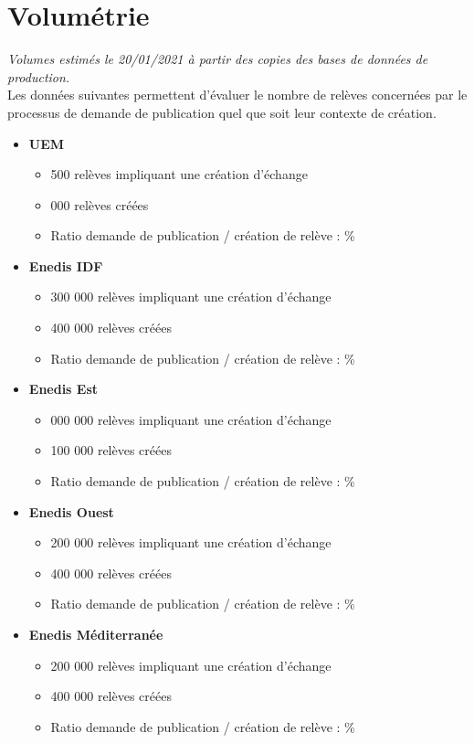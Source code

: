 \documentclass[a4paper, 12pt]{report}
\begin{document}

\chapter{Volumétrie}
\label{appendix:volumetrie}

\textit{Volumes estimés le 20/01/2021 à partir des copies des bases de données de production.}\\

Les données suivantes permettent d’évaluer le nombre de relèves concernées par le processus de demande de publication quel que soit leur contexte de création.\\

\begin{itemize}
  \item \textbf{UEM}
  \begin{itemize}
    \item \approx{} 500 relèves impliquant une création d'échange
    \item \approx{} 000 relèves créées
    \item Ratio demande de publication / création de relève : \approx{}\%
  \end{itemize}
  \item \textbf{Enedis IDF}
  \begin{itemize}
    \item \approx{} 300 000 relèves impliquant une création d'échange
    \item \approx{} 400 000 relèves créées
    \item Ratio demande de publication / création de relève : \approx{}\%
  \end{itemize}
  \item \textbf{Enedis Est}
  \begin{itemize}
    \item \approx{} 000 000 relèves impliquant une création d'échange
    \item \approx{} 100 000 relèves créées
    \item Ratio demande de publication / création de relève : \approx{}\%
  \end{itemize}
  \item \textbf{Enedis Ouest}
  \begin{itemize}
    \item \approx{} 200 000 relèves impliquant une création d'échange
    \item \approx{} 400 000 relèves créées
    \item Ratio demande de publication / création de relève : \approx{}\%
  \end{itemize}
  \item \textbf{Enedis Méditerranée}
  \begin{itemize}
    \item \approx{} 200 000 relèves impliquant une création d'échange
    \item \approx{} 400 000 relèves créées
    \item Ratio demande de publication / création de relève : \approx{}\%
  \end{itemize}
\end{itemize}
\end{document}
